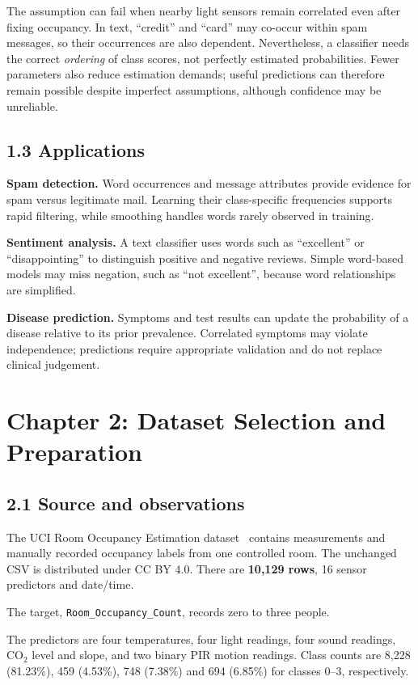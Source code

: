 \documentclass[12pt,a4paper]{article}
\begin{document}
The assumption can fail when nearby light sensors remain correlated even after fixing occupancy. In text, ``credit'' and ``card'' may co-occur within spam messages, so their occurrences are also dependent. Nevertheless, a classifier needs the correct \emph{ordering} of class scores, not perfectly estimated probabilities. Fewer parameters also reduce estimation demands; useful predictions can therefore remain possible despite imperfect assumptions, although confidence may be unreliable.

\clearpage
\subsection{1.3 Applications}
\textbf{Spam detection.} Word occurrences and message attributes provide evidence for spam versus legitimate mail. Learning their class-specific frequencies supports rapid filtering, while smoothing handles words rarely observed in training.

\textbf{Sentiment analysis.} A text classifier uses words such as ``excellent'' or ``disappointing'' to distinguish positive and negative reviews. Simple word-based models may miss negation, such as ``not excellent'', because word relationships are simplified.

\textbf{Disease prediction.} Symptoms and test results can update the probability of a disease relative to its prior prevalence. Correlated symptoms may violate independence; predictions require appropriate validation and do not replace clinical judgement.

\section{Chapter 2: Dataset Selection and Preparation}
\subsection{2.1 Source and observations}
The UCI Room Occupancy Estimation dataset~\cite{dataset} contains measurements and manually recorded occupancy labels from one controlled room. The unchanged CSV is distributed under CC BY 4.0. There are \textbf{10,129 rows}, 16 sensor predictors and date/time.

The target, \texttt{Room\_Occupancy\_Count}, records zero to three people.

The predictors are four temperatures, four light readings, four sound readings, CO$_2$ level and slope, and two binary PIR motion readings. Class counts are 8,228 (81.23\%), 459 (4.53\%), 748 (7.38\%) and 694 (6.85\%) for classes 0--3, respectively.
\end{document}
